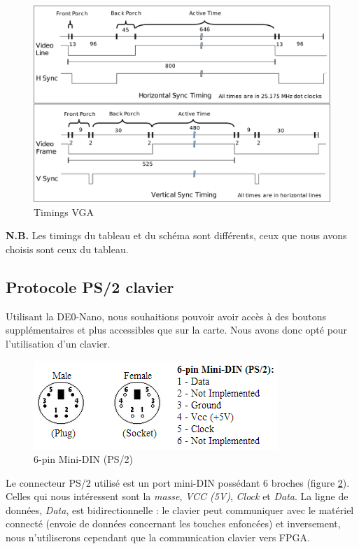\begin{figure}[h!]
	\centering
	\includegraphics[scale=0.45]{images/vgatiming.png}
	\caption{Timings VGA \cite{cite:psocvga}}
	\label{fig:vgatiming}
\end{figure}

\noindent \textbf{N.B.} Les timings du tableau \cite{cite:timingsvga} et du schéma \cite{cite:psocvga} sont différents, ceux que nous avons choisis sont ceux du tableau.

\newpage
\subsection{Protocole PS/2 clavier}
Utilisant la DE0-Nano, nous souhaitions pouvoir avoir accès à des boutons supplémentaires et plus accessibles que sur la carte. Nous avons donc opté pour l'utilisation d'un clavier.\\

\begin{figure}[h!]
	\centering
	\includegraphics{images/ps2.png}
	\caption{6-pin Mini-DIN (PS/2) \cite{cite:ps2protocol}}
	\label{fig:ps2}
\end{figure}

Le connecteur PS/2 utilisé est un port mini-DIN possédant 6 broches (figure \ref{fig:ps2}). Celles qui nous intéressent sont la \emph{masse}, \emph{VCC (5V)}, \emph{Clock} et \emph{Data}. La ligne de données, \emph{Data}, est bidirectionnelle : le clavier peut communiquer avec le matériel connecté (envoie de données concernant les touches enfoncées) et inversement, nous n'utiliserons cependant que la communication clavier vers FPGA.\\

